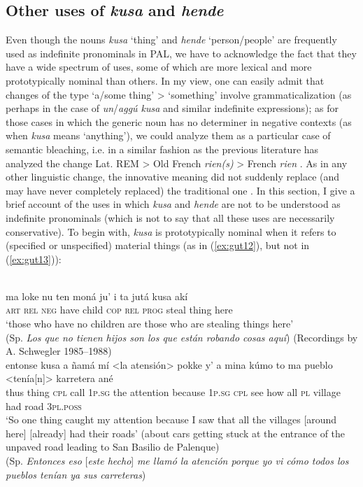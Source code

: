 \documentclass[output=paper,colorlinks,citecolor=brown]{langscibook}
\begin{document}
\subsection{Other uses of \textit{kusa} and \textit{hende}}\label{sec:gut2.2}
Even though the nouns \textit{kusa} ‘thing’ and \textit{hende} ‘person/people’ are frequently used as indefinite pronominals in PAL, we have to acknowledge the fact that they have a wide spectrum of uses, some of which are more lexical and more prototypically nominal than others. In my view, one can easily admit that changes of the type ‘a/some thing’ > ‘something’ involve grammaticalization (as perhaps in the case of \textit{un}/\textit{aggú kusa} and similar indefinite expressions); as for those cases in which the generic noun has no determiner in negative contexts (as when \textit{kusa} means ‘anything’), we could analyze them as a particular case of semantic bleaching, i.e. in a similar fashion as the previous literature has analyzed the change Lat. REM > Old French \textit{rien(s)} > French \textit{rien} \citep[s.][364]{Roberts2012}. As in any other linguistic change, the innovative meaning did not suddenly replace (and may have never completely replaced) the traditional one \citep{Hopper1991}. In this section, I give a brief account of the uses in which \textit{kusa} and \textit{hende} are not to be understood as indefinite pronominals (which is not to say that all these uses are necessarily conservative).  
To begin with, \textit{kusa} is prototypically nominal when it refers to (specified or unspecified) material things (as in (\ref{ex:gut12}), but not in (\ref{ex:gut13})): 

\ea\label{ex:gut12}\citep[247]{MagliaMoñino2015}\\
\gll ma loke nu ten moná ju’ i ta jutá kusa akí \\
\textsc{art} \textsc{rel} \textsc{neg} have child \textsc{cop} \textsc{rel} \textsc{prog} steal thing here \\
\glt ‘those who have no children are those who are stealing things here’ \\
(Sp. \textit{Los que no tienen hijos son los que están robando cosas aquí}) 
\ex\label{ex:gut13}(Recordings by A. Schwegler 1985--1988)\\
\gll entonse kusa a ñamá mí <la atensión> pokke y’ a mina kúmo to ma pueblo <tenía[n]> karretera ané \\
thus thing \textsc{cpl} call 1\textsc{p.sg} the attention because 1\textsc{p.sg} \textsc{cpl} see how all \textsc{pl} village had road 3\textsc{pl.poss} \\
\glt ‘So one thing caught my attention because I saw that all the villages [around here] [already] had their roads’ (about cars getting stuck at the entrance of the unpaved road leading to San Basilio de Palenque) \\
(Sp. \textit{Entonces eso }[\textit{este hecho}] \textit{me llamó la atención porque yo vi cómo todos los pueblos tenían ya sus carreteras}) 
\z
\end{document}
